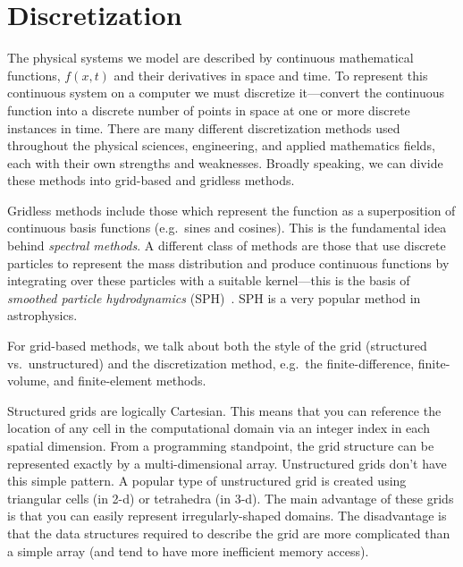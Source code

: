 \section{Discretization}

The physical systems we model are described by continuous mathematical
functions, $f(x,t)$ and their derivatives in space and time.  To
represent this continuous system on a computer we must discretize
it---convert the continuous function into a discrete number of points
in space at one or more discrete instances in time.
There are many different discretization methods used throughout the
physical sciences, engineering, and applied mathematics fields, each
with their own strengths and weaknesses.  Broadly speaking, we can
divide these methods into grid-based and gridless methods.


Gridless methods include those which represent the function as a
superposition of continuous basis functions (e.g.\ sines and cosines).
This is the fundamental idea behind {\em spectral methods}.  A different
class of methods are those that use discrete particles to represent the
mass distribution and produce continuous functions by integrating
over these particles with a suitable kernel---this is the basis of
{\em smoothed particle hydrodynamics} (SPH)~\cite{SPH}.  SPH is a very popular
method in astrophysics.

For grid-based methods, we talk about both the style of the grid
(structured vs.\ unstructured) and the discretization method, e.g.\ the
finite-difference, finite-volume, and finite-element methods.

Structured grids are logically Cartesian.  This means that you can
reference the location of any cell in the computational domain via an
integer index in each spatial dimension.  From a programming
standpoint, the grid structure can be represented exactly by a
multi-dimensional array.  Unstructured grids don't have this simple
pattern.  A popular type of unstructured grid is created using
triangular cells (in 2-d) or tetrahedra (in 3-d).   The main advantage of these grids is that you can easily
represent irregularly-shaped domains.  The disadvantage is that the
data structures required to describe the grid are more complicated
than a simple array (and tend to have more inefficient memory access).

